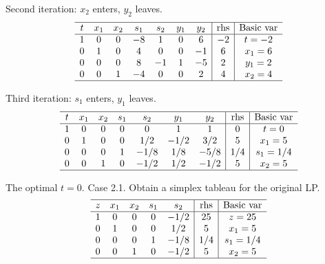 \documentclass[12pt]{article}
\begin{document}
Second iteration: $x_2$ enters, $y_2$ leaves.
\begin{equation*}
  \begin{array}{ccccccc|c|c}
    \hline
    t &  x_1      &  x_2   &  s_1 & s_2 & y_1 & y_2        &   \text{rhs} & \text{Basic var}  \\ \hline
    1 &    0      &  0  &    -8       & 1  & 0 & 6 & -2          &  t=-2              \\
    0 &    1      &  0  &    4       & 0  & 0 & -1 & 6          &  x_1=6              \\
    0 &    0      &  0   &    8       & -1 & 1 & -5 & 2            &  y_1 = 2          \\
    0 &    0      &  1   &   -4       & 0    & 0 & 2 & 4        &  x_2 = 4          \\ \hline
  \end{array}
\end{equation*}

Third iteration: $s_1$ enters, $y_1$ leaves.
\begin{equation*}
  \begin{array}{ccccccc|c|c}
    \hline
    t &  x_1      &  x_2   &  s_1 & s_2 & y_1 & y_2        &   \text{rhs} & \text{Basic var}  \\ \hline
    1 &    0      &  0  &    0       & 0  & 1 & 1 & 0          &  t=0              \\
    0 &    1      &  0  &    0       & 1/2  & -1/2 & 3/2 & 5          &  x_1=5              \\
    0 &    0      &  0   &    1       & -1/8 & 1/8 & -5/8 & 1/4            &  s_1 = 1/4          \\
    0 &    0      &  1   &  0      & -1/2    & 1/2 & -1/2 & 5        &  x_2 = 5          \\ \hline
  \end{array}
\end{equation*}

The optimal $t=0$. Case 2.1. Obtain a simplex tableau for the original LP.
\begin{equation*}
  \begin{array}{ccccc|c|c}
    \hline
    z &  x_1      &  x_2   &  s_1 & s_2 &   \text{rhs} & \text{Basic var}  \\ \hline
    1 &    0      &  0  &    0       & -1/2  &  25          &  z=25              \\
    0 &    1      &  0  &    0       & 1/2  &  5          &  x_1=5              \\
    0 &    0      &  0   &    1      & -1/8 & 1/4            &  s_1 = 1/4          \\
    0 &    0      &  1   &  0      & -1/2    & 5        &  x_2 = 5          \\ \hline
  \end{array}
\end{equation*}
\end{document}
